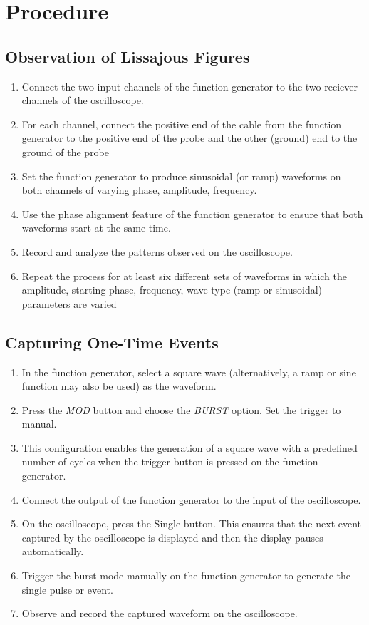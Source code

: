 \documentclass[report]{IEEEtran}
\begin{document}
\section*{Procedure}

\subsection*{Observation of Lissajous Figures}
\begin{enumerate}
\item Connect the two input channels of the function generator to the two reciever channels of the oscilloscope.\\
\item For each channel, connect the positive end of the cable from the function generator to the positive end of the probe and the other (ground) end to the ground of the probe\\
\item Set the function generator to produce sinusoidal (or ramp) waveforms on both channels of varying phase, amplitude, frequency.\\
\item Use the phase alignment feature of the function generator to ensure that both waveforms start at the same time.\\
\item Record and analyze the patterns observed on the oscilloscope.\\
\item Repeat the process for at least six different sets of waveforms in which the amplitude, starting-phase, frequency, wave-type (ramp or sinusoidal) parameters are varied\\
\end{enumerate}

\subsection*{Capturing One-Time Events}
\begin{enumerate}
    \item In the function generator, select a square wave (alternatively, a ramp or sine function may also be used) as the waveform.
    \item Press the \textit{MOD} button and choose the \textit{BURST} option. Set the trigger to manual.
    \item This configuration enables the generation of a square wave with a predefined number of cycles when the trigger button is pressed on the function generator.
    \item Connect the output of the function generator to the input of the oscilloscope.
    \item On the oscilloscope, press the Single button. This ensures that the next event captured by the oscilloscope is displayed and then the display pauses automatically.
    \item Trigger the burst mode manually on the function generator to generate the single pulse or event.
    \item Observe and record the captured waveform on the oscilloscope.
\end{enumerate}
\end{document}
